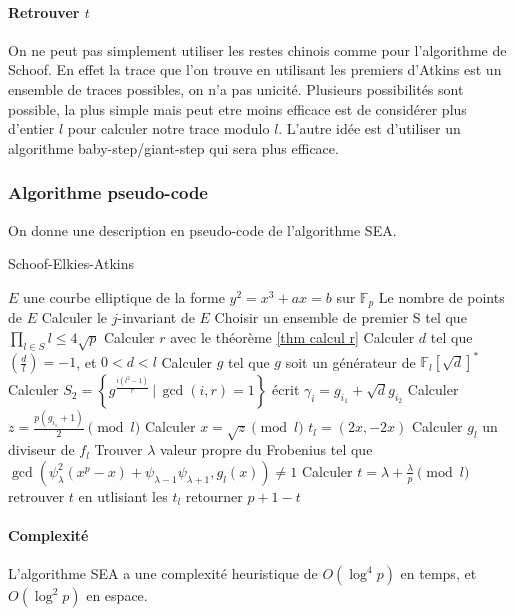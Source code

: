 \documentclass[12pt]{article}
\begin{document}
\paragraph*{Retrouver $t$}
On ne peut pas simplement utiliser les restes chinois comme pour l'algorithme de Schoof. En effet la trace que l'on trouve en utilisant les premiers d'Atkins est un ensemble de traces possibles, on n'a pas unicité. Plusieurs possibilités sont possible, la plus simple mais peut etre moins efficace est de considérer plus d'entier $l$ pour calculer notre trace modulo $l$. L'autre idée est d'utiliser un algorithme baby-step/giant-step qui sera plus efficace.

\newpage
\subsubsection{Algorithme pseudo-code}
On donne une description en pseudo-code de l'algorithme SEA.
\begin{algorithm}
\caption{Schoof-Elkies-Atkins}
\begin{algorithmic}
\REQUIRE $E$ une courbe elliptique de la forme $y^2 = x^3 + ax = b$ sur $\mathbb{F}_p$
\ENSURE Le nombre de points de $E$
\STATE Calculer le $j$-invariant de $E$
\STATE Choisir un ensemble de premier S tel que $\prod_{l \in S}l \leq 4\sqrt{p}$
\STATE Calculer $r$ avec le théorème \ref{thm calcul r}
\STATE Calculer $d$ tel que $(\frac{d}{l}) = -1$, et $0<d<l$
\STATE Calculer $g$ tel que $g$ soit un générateur de $\mathbb{F}_l[\sqrt{d}]^*$
\STATE Calculer $S_2 = \left\{g^{\frac{i(l^2-1)}{r}} \, | \, \gcd(i,r) = 1 \right\}$
\STATE écrit $\gamma_i = g_{i_1} + \sqrt{d}g_{i_2}$
\STATE Calculer $z= \frac{p(g_{i_1} +1)}{2} \pmod l$
\STATE Calculer $x = \sqrt{z} \pmod l$
\STATE $t_l = (2x,-2x)$
\ENDIF
\ENDFOR
\ELSE
\STATE Calculer $g_l$ un diviseur de $f_l$
\STATE Trouver $\lambda$ valeur propre du Frobenius tel que $\gcd(\psi_{\lambda}^2(x^p-x) + \psi_{\lambda-1}\psi_{\lambda+1}, g_l(x)) \ne 1$
\STATE Calculer $t = \lambda + \frac{\lambda}{p} \pmod l$
\ENDIF
\ENDFOR
\STATE retrouver $t$ en utlisiant les $t_l$ 
\STATE retourner $p+1-t$
\end{algorithmic}
\end{algorithm}

\paragraph*{Complexité}
L'algorithme SEA a une complexité heuristique de $O(\log^4 p)$ en temps, et $O(\log^2 p)$ en espace.
\newpage
\end{document}
